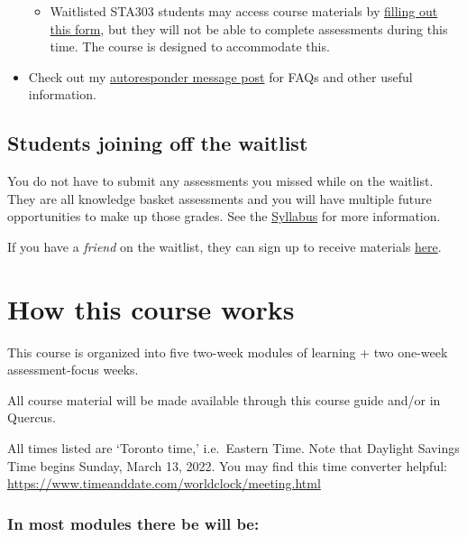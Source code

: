 \documentclass[
  openany]{book}
\providecommand{\tightlist}{%
  \setlength{\itemsep}{0pt}\setlength{\parskip}{0pt}}
\begin{document}
\begin{itemize}
  \begin{itemize}
  \tightlist
  \item
    Waitlisted STA303 students may access course materials by \href{https://forms.office.com/r/sKWPFFE2Cd}{filling out this form}, but they will not be able to complete assessments during this time. The course is designed to accommodate this.
  \end{itemize}
\item
  Check out my \href{https://www.lizabolton.com/autoresponder.html}{autoresponder message post} for FAQs and other useful information.
\end{itemize}

\hypertarget{students-joining-off-the-waitlist}{%
\subsection{Students joining off the waitlist}\label{students-joining-off-the-waitlist}}

You do not have to submit any assessments you missed while on the waitlist. They are all knowledge basket assessments and you will have multiple future opportunities to make up those grades. See the \protect\hyperlink{syllabus}{Syllabus} for more information.

If you have a \emph{friend} on the waitlist, they can sign up to receive materials \href{https://forms.office.com/r/sKWPFFE2Cd}{here}.

\hypertarget{howthiscourseworks}{%
\section{How this course works}\label{howthiscourseworks}}

This course is organized into five two-week modules of learning + two one-week assessment-focus weeks.

All course material will be made available through this course guide and/or in Quercus.

All times listed are `Toronto time,' i.e.~Eastern Time. Note that Daylight Savings Time begins Sunday, March 13, 2022. You may find this time converter helpful: \url{https://www.timeanddate.com/worldclock/meeting.html}

\hypertarget{in-most-modules-there-be-will-be}{%
\subsubsection{\texorpdfstring{\textbf{In most modules there be will be:}}{In most modules there be will be:}}\label{in-most-modules-there-be-will-be}}
\end{document}
